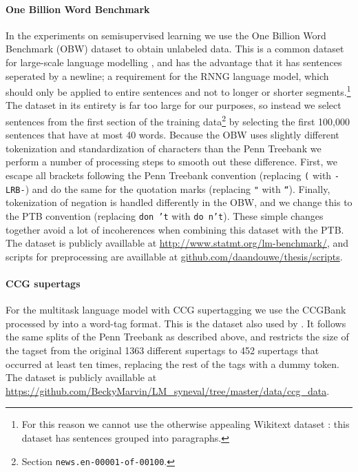\paragraph{One Billion Word Benchmark}
In the experiments on semisupervised learning we use the One Billion Word Benchmark (OBW) dataset \citep{chelba2013one} to obtain unlabeled data. This is a common dataset for large-scale language modelling \citep{jozefowicz2016exploring}, and has the advantage that it has sentences seperated by a newline; a requirement for the RNNG language model, which should only be applied to entire sentences and not to longer or shorter segments.\footnote{For this reason we cannot use the otherwise appealing Wikitext dataset \citep{merity2016pointer}: this dataset has sentences grouped into paragraphs.} The dataset in its entirety is far too large for our purposes, so instead we select sentences from the first section of the training data\footnote{Section \texttt{news.en-00001-of-00100}.} by selecting the first 100,000 sentences that have at most 40 words. Because the OBW uses slightly different tokenization and standardization of characters than the Penn Treebank we perform a number of processing steps to smooth out these difference. First, we escape all brackets following the Penn Treebank convention (replacing \texttt{(} with \texttt{-LRB-}) and do the same for the quotation marks (replacing \texttt{"} with \texttt{``}). Finally, tokenization of negation is handled differently in the OBW, and we change this to the PTB convention (replacing \texttt{don 't} with \texttt{do n't}). These simple changes together avoid a lot of incoherences when combining this dataset with the PTB. The dataset is publicly availlable at \url{http://www.statmt.org/lm-benchmark/}, and scripts for preprocessing are availlable at \url{github.com/daandouwe/thesis/scripts}.

\paragraph{CCG supertags}
For the multitask language model with CCG supertagging we use the CCGBank \citep{hockenmaier2007ccgbank} processed by \citet{enguehard2017multitask} into a word-tag format. This is the dataset also used by \citet{linzen2018targeted}. It follows the same splits of the Penn Treebank as described above, and restricts the size of the tagset from the original 1363 different supertags to 452 supertags that occurred at least ten times, replacing the rest of the tags with a dummy token. The dataset is publicly availlable at \url{https://github.com/BeckyMarvin/LM_syneval/tree/master/data/ccg_data}.



